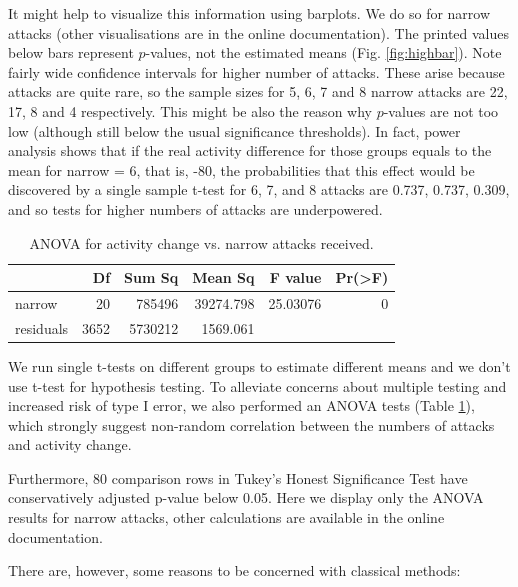 \documentclass[a4paper,fleqn]{cas-dc}
\begin{document}
It might help to visualize this information using barplots. We do so for
narrow attacks (other visualisations are in the online documentation).
The printed values below bars represent \(p\)-values, not the estimated
means (Fig. \ref{fig:highbar}). Note fairly wide confidence intervals
for higher number of attacks. These arise because attacks are quite
rare, so the sample sizes for 5, 6, 7 and 8 narrow attacks are 22, 17, 8
and 4 respectively. This might be also the reason why \(p\)-values are
not too low (although still below the usual significance
thresholds). In fact, power analysis shows that if the real activity difference for those groups equals to the mean for \textsf{narrow = 6}, that is, -80, the probabilities that this effect would be discovered by a single sample t-test for 6, 7, and 8 attacks are 0.737, 0.737, 0.309, and so tests for higher numbers of attacks are underpowered.

\begin{table}[H]\footnotesize
\begin{tabular}{l|r|r|r|r|r}
\hline
  & Df & Sum Sq & Mean Sq & F value & Pr(>F)\\
\hline
narrow & 20 & 785496 & 39274.798 & 25.03076 & 0\\
\hline
residuals & 3652 & 5730212 & 1569.061 &  & \\
\hline
\end{tabular}

\caption{ANOVA for activity change vs. narrow  attacks received.}
\label{tab:anovanarrow}
\end{table}
\normalsize

We run single t-tests on different groups to estimate different means
and we don't use t-test for hypothesis testing. To alleviate concerns
about multiple testing and increased risk of type I error, we also
performed an ANOVA tests (Table \ref{tab:anovanarrow}), which strongly suggest non-random correlation
between the numbers of attacks and activity change.

Furthermore, 80 comparison rows in Tukey's Honest Significance Test
\citep{Tukey1949} have conservatively adjusted p-value below 0.05. Here we
display only the ANOVA results for narrow attacks, other calculations
are available in the online documentation.

There are, however, some reasons to be concerned with classical methods:
\end{document}
